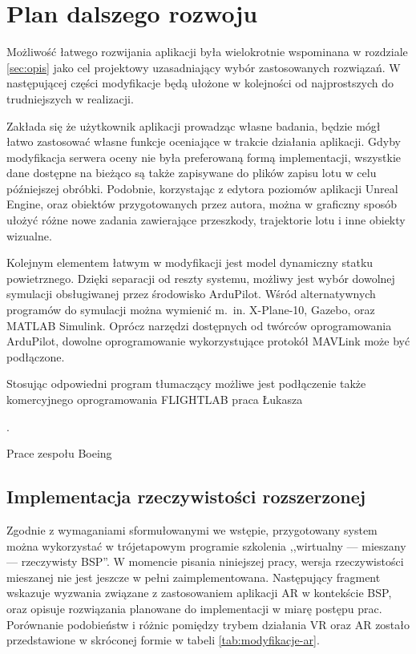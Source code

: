 \newpage
\section{Plan dalszego rozwoju}
Możliwość łatwego rozwijania aplikacji była wielokrotnie wspominana w rozdziale \ref{sec:opis} jako cel projektowy uzasadniający wybór zastosowanych rozwiązań. W następującej części modyfikacje będą ułożone w kolejności od najprostszych do trudniejszych w realizacji.

Zakłada się że użytkownik aplikacji prowadząc własne badania, będzie mógł łatwo zastosować własne funkcje oceniające w trakcie działania aplikacji. Gdyby modyfikacja serwera oceny nie była preferowaną formą implementacji, wszystkie dane dostępne na bieżąco są także zapisywane do plików zapisu lotu w celu późniejszej obróbki. Podobnie, korzystając z edytora poziomów aplikacji Unreal Engine, oraz obiektów przygotowanych przez autora, można w graficzny sposób ułożyć różne nowe zadania zawierające przeszkody, trajektorie lotu i inne obiekty wizualne.

Kolejnym elementem łatwym w modyfikacji jest model dynamiczny statku powietrznego. Dzięki separacji od reszty systemu, możliwy jest wybór dowolnej symulacji obsługiwanej przez środowisko ArduPilot. Wśród alternatywnych programów do symulacji można wymienić m.~in. X-Plane-10, Gazebo, oraz MATLAB Simulink. Oprócz narzędzi dostępnych od twórców oprogramowania ArduPilot, dowolne oprogramowanie wykorzystujące protokół MAVLink może być podłączone. \begin{todo}Stosując odpowiedni program tłumaczący możliwe jest podłączenie także komercyjnego oprogramowania FLIGHTLAB praca Łukasza\end{todo}.

\begin{todo}
    Prace zespołu Boeing
\end{todo}

\subsection{Implementacja rzeczywistości rozszerzonej}
Zgodnie z wymaganiami sformułowanymi we wstępie, przygotowany system można wykorzystać w trójetapowym programie szkolenia ,,wirtualny --- mieszany --- rzeczywisty BSP''. W momencie pisania niniejszej pracy, wersja rzeczywistości mieszanej nie jest jeszcze w pełni zaimplementowana. Następujący fragment wskazuje wyzwania związane z zastosowaniem aplikacji AR w kontekście BSP, oraz opisuje rozwiązania planowane do implementacji w miarę postępu prac. Porównanie podobieństw i różnic pomiędzy trybem działania VR oraz AR zostało przedstawione w skróconej formie w tabeli \ref{tab:modyfikacje-ar}.

